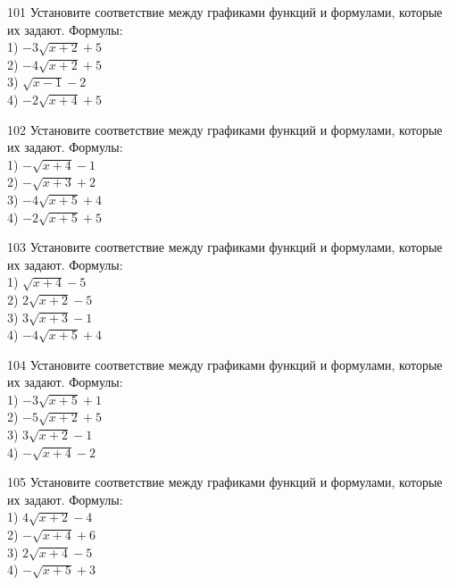 \documentclass[4apaper]{article}
\begin{document}
\begin{taskBN}{101}
Установите соответствие между графиками функций и формулами, которые их задают. Формулы: \\1) $-3\sqrt{x+2}+5$\\2) $-4\sqrt{x+2}+5$\\3) $\sqrt{x-1}-2$\\4) $-2\sqrt{x+4}+5$
\end{taskBN}

\begin{taskBN}{102}
Установите соответствие между графиками функций и формулами, которые их задают. Формулы: \\1) $-\sqrt{x+4}-1$\\2) $-\sqrt{x+3}+2$\\3) $-4\sqrt{x+5}+4$\\4) $-2\sqrt{x+5}+5$
\end{taskBN}

\begin{taskBN}{103}
Установите соответствие между графиками функций и формулами, которые их задают. Формулы: \\1) $\sqrt{x+4}-5$\\2) $2\sqrt{x+2}-5$\\3) $3\sqrt{x+3}-1$\\4) $-4\sqrt{x+5}+4$
\end{taskBN}

\begin{taskBN}{104}
Установите соответствие между графиками функций и формулами, которые их задают. Формулы: \\1) $-3\sqrt{x+5}+1$\\2) $-5\sqrt{x+2}+5$\\3) $3\sqrt{x+2}-1$\\4) $-\sqrt{x+4}-2$
\end{taskBN}

\begin{taskBN}{105}
Установите соответствие между графиками функций и формулами, которые их задают. Формулы: \\1) $4\sqrt{x+2}-4$\\2) $-\sqrt{x+4}+6$\\3) $2\sqrt{x+4}-5$\\4) $-\sqrt{x+5}+3$
\end{taskBN}
\end{document}

